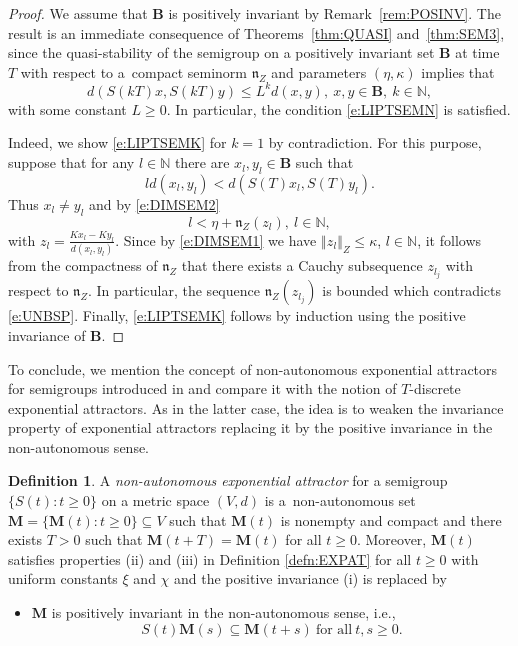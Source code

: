 \documentclass[a4paper,12pt,reqno]{amsart}
\theoremstyle{plain}
\theoremstyle{definition}
\newtheorem{defn}[lem]{Definition}
\numberwithin{equation}{section}
\newcommand{\N}{\mathbb{N}}
\newcommand{\norm}[1]{\left\Vert#1\right\Vert}
\renewcommand{\geq}{\geqslant}
\renewcommand{\leq}{\leqslant}
\begin{document}
\begin{proof}
We assume that $\mathbf{B}$ is positively invariant by Remark~\ref{rem:POSINV}.
The result is an immediate consequence of Theorems~\ref{thm:QUASI} and~\ref{thm:SEM3}, since the quasi-stability of the semigroup on a positively invariant set $\mathbf{B}$ at time $T$ with respect to a~compact seminorm $\mathfrak{n}_{Z}$ and parameters $(\eta,\kappa)$
implies that
\begin{equation}\label{e:LIPTSEMK}
d(S(kT)x,S(kT)y)\leq L^{k} d(x,y),\ x,y\in \mathbf{B},\ k\in\N,
\end{equation}
with some constant $L\geq 0$. In particular, the condition \eqref{e:LIPTSEMN} is satisfied.

Indeed, we show \eqref{e:LIPTSEMK} for $k=1$ by contradiction. For this purpose, suppose that for any $l\in\N$ there are $x_l, y_l\in \mathbf{B}$ such that
$$l d(x_l,y_l)<d(S(T)x_l,S(T)y_l).$$
Thus $x_l\neq y_l$ and by \eqref{e:DIMSEM2}
\begin{equation}\label{e:UNBSP}
l<\eta+\mathfrak{n}_{Z}(z_l),\ l\in\N,
\end{equation}
with $z_l=\frac{Kx_l-Ky_l}{d(x_l,y_l)}$.
Since by \eqref{e:DIMSEM1} we have $\norm{z_l}_{Z}\leq\kappa$, $l\in\N$, it follows from
the compactness of $\mathfrak{n}_{Z}$ that there exists a Cauchy subsequence $z_{l_j}$
with respect to $\mathfrak{n}_{Z}$. In particular, the sequence $\mathfrak{n}_{Z}(z_{l_j})$
is bounded which contradicts \eqref{e:UNBSP}.
Finally, \eqref{e:LIPTSEMK} follows by induction using the positive invariance of $\mathbf{B}$.
\end{proof}

To conclude, we mention the concept of non-autonomous exponential attractors for semigroups introduced in \cite{CaSo, sonner2012} and compare it with the notion of $T$-discrete exponential attractors. As in the latter case, the idea is to weaken the invariance property of exponential attractors replacing it by the positive invariance in the non-autonomous sense. 
\begin{defn}
A \emph{non-autonomous exponential attractor} for a semigroup $\{S(t)\colon t\geq 0\}$ on a metric space $(V,d)$ is a~non-autonomous  set $\mathbf{M}=\{\mathbf{M}(t)\colon t\geq 0\}\subseteq V$ such that $\mathbf{M}(t)$ is nonempty and compact and there exists $T>0$ such that $\mathbf{M}(t+T)=\mathbf{M}(t)$ for all $t\geq 0$.  Moreover, $\mathbf{M}(t)$ satisfies properties (ii) and (iii) in Definition \ref{defn:EXPAT} for all $t\geq 0$ with uniform constants $\xi$ and $\chi$ and the positive invariance (i) is replaced by 
\begin{itemize}
\item[(i'')] $\mathbf{M}$ is positively invariant in the non-autonomous sense, i.e., 
$$S(t)\mathbf{M}(s) \subseteq \mathbf{M}(t + s)\ \text{for all}\  t, s \geq 0.$$
\end{itemize}
\end{defn}
\end{document}
